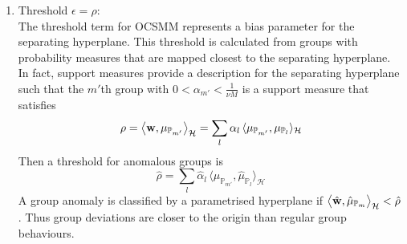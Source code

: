  \begin{table}[H]
 
\begin{center}
\tabcolsep=0.25cm
\end{center}
 \caption{ Examples of different kernels for probability distribution $\mathbb{P}=N(0,1)$. %
 }
 \label{Tab:Kernel}
\end{table}

 \begin{enumerate}[4.]
\item  Threshold $\epsilon= \rho$: \\  The  threshold term for OCSMM represents a bias parameter for the separating  hyperplane. This threshold is calculated from   groups with probability measures that are mapped closest to the separating hyperplane. In fact,   support measures provide a description for the separating hyperplane such that the $m'$th group with $ 0 <\alpha_{m'} < \displaystyle \frac{1}{\nu M}$ is a support measure  that satisfies 
\[ \rho  %
 = \big\langle {\bf w},\mu_{\mathbb{P}_{m'} } \big \rangle_\mathcal{H}= \sum_{l} \alpha_l \, \langle \mu_{\mathbb{P}_{m'} }, \mu_{\mathbb{P}_l}\rangle_\mathcal{H}  \]
Then a threshold for anomalous groups is     \[\hat{\rho}=  \sum_{l} \hat{\alpha}_l \, \langle \hat{\mu}_{\mathbb{P}_{m'}}, \hat{\mu}_{\mathbb{P}_l}\rangle_\mathcal{H} \] 
A group anomaly is classified by a parametrised hyperplane if
$   \big\langle \hat{\bf w},\hat{\mu}_{\mathbb{P}_m } \big \rangle_\mathcal{H}  < \hat{\rho}$. Thus group deviations are closer to the origin than regular group behaviours. 
 \end{enumerate}
 
